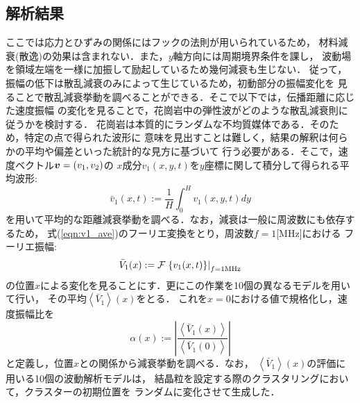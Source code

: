 \subsection{解析結果}
ここでは応力とひずみの関係にはフックの法則が用いられているため，
材料減衰(散逸)の効果は含まれない．また，$y$軸方向には周期境界条件を課し，
波動場を領域左端を一様に加振して励起しているため幾何減衰も生じない．
従って，振幅の低下は散乱減衰のみによって生じているため，初動部分の振幅変化を
見ることで散乱減衰挙動を調べることができる．そこで以下では，伝播距離に応じた速度振幅
の変化を見ることで，花崗岩中の弾性波がどのような散乱減衰則に従うかを検討する．
花崗岩は本質的にランダムな不均質媒体である．そのため，特定の点で得られた波形に
意味を見出すことは難しく，結果の解釈は何らかの平均や偏差といった統計的な見方に基づいて
行う必要がある．そこで，速度ベクトル$\mbox{\boldmath{$v$}}=(v_1,v_2)$の
$x$成分$v_1(x,y,t)$を$y$座標に関して積分して得られる平均波形:
\begin{equation}
	\bar v_1(x,t):=\frac{1}{H}\int_0^Hv_1(x,y,t)dy
	\label{eqn:v1_ave}
\end{equation}
を用いて平均的な距離減衰挙動を調べる．なお，減衰は一般に周波数にも依存するため，
式(\ref{eqn:v1_ave})のフーリエ変換をとり，周波数$f=1$[MHz]における
フーリエ振幅:
\begin{equation}
	\bar V_1(x):={\cal F} \left. \left\{ v_1(x,t)\right\} \right|_{f=1{\rm MHz}} 
	\label{eqn:}
\end{equation}
の位置$x$による変化を見ることにす．更にこの作業を10個の異なるモデルを用いて行い，
その平均$\left< \bar V_1 \right>(x)$をとる．
これを$x=0$における値で規格化し，速度振幅比を
\begin{equation}
	\alpha(x) := 
	\left|
	\frac
	{ \left< \bar V_1(x) \right>}
	{ \left< \bar V_1(0) \right>}
	\right|
	\label{eqn:decay_x}
\end{equation}
と定義し，位置$x$との関係から減衰挙動を調べる．なお，
$\left<\bar V_1\right>(x)$の評価に用いる10個の波動解析モデルは，
結晶粒を設定する際のクラスタリングにおいて，クラスターの初期位置を
ランダムに変化させて生成した．

